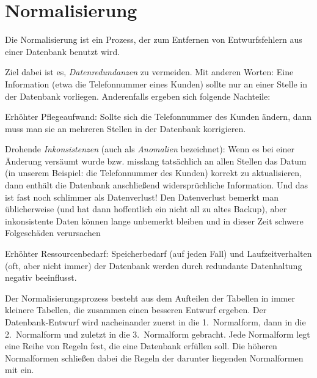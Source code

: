 \chapter{Normalisierung}
\renewcommand{\chaptertitle}{Normalisierung}

\lehead[]{\sf\hspace*{-2.00cm}\textcolor{white}{\colorbox{lightblue}{\makebox[1.60cm][r]{\thechapter}}}\hspace{0.17cm}\textcolor{lightblue}{\chaptertitle}}
\rohead[]{\textcolor{lightblue}{\chaptertitle}\sf\hspace*{0.17cm}\textcolor{white}{\colorbox{lightblue}{\makebox[1.60cm][l]{\thechapter}}}\hspace{-2.00cm}}
\rehead[]{\textcolor{lightblue}{AvHG, Inf, My}}
\lohead[]{\textcolor{lightblue}{AvHG, Inf, My}}

Die Normalisierung ist ein Prozess, der zum Entfernen von Entwurfsfehlern aus
einer Datenbank benutzt wird. 

Ziel dabei ist es, \emph{Datenredundanzen} zu vermeiden. Mit anderen Worten:
Eine Information (etwa die Telefonnummer eines Kunden) sollte nur an einer Stelle in
der Datenbank vorliegen. Anderenfalls ergeben sich folgende Nachteile:

\begin{compactitem}
\item Erhöhter Pflegeaufwand: Sollte sich die Telefonnummer des Kunden ändern,
dann muss man sie an mehreren Stellen in der Datenbank korrigieren.
\item Drohende \emph{Inkonsistenzen} (auch als \emph{Anomalien} bezeichnet):
Wenn es bei einer Änderung versäumt wurde bzw. misslang tatsächlich an allen
Stellen das Datum (in unserem Beispiel: die Telefonnummer des Kunden) korrekt zu
aktualisieren, dann enthält die Datenbank anschließend widersprüchliche
Information. Und das ist fast noch schlimmer als Datenverlust! Den Datenverlust
bemerkt man üblicherweise (und hat dann hoffentlich ein nicht all zu altes
Backup), aber inkonsistente Daten können lange unbemerkt bleiben und in dieser
Zeit schwere Folgeschäden verursachen
\item Erhöhter Ressourcenbedarf: Speicherbedarf (auf jeden Fall) und
Laufzeitverhalten (oft, aber nicht immer) der Datenbank werden durch redundante
Datenhaltung negativ beeinflusst.
\end{compactitem}

Der Normalisierungsprozess besteht aus dem
Aufteilen der Tabellen in immer kleinere Tabellen, die zusammen einen besseren
Entwurf ergeben. Der Datenbank-Entwurf wird nacheinander zuerst in die
1.~Normalform, dann in die 2.~Normalform und zuletzt in die 3.~Normalform
gebracht. Jede Normalform legt eine Reihe von Regeln fest, die eine Datenbank
erfüllen soll. Die höheren Normalformen schließen dabei die Regeln der darunter
liegenden Normalformen mit ein.


